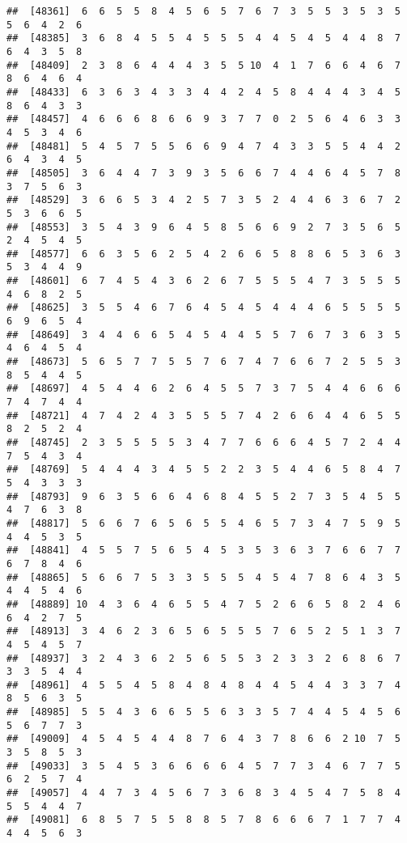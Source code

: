 \documentclass[
]{book}
\begin{document}
\begin{verbatim}
##  [48361]  6  6  5  5  8  4  5  6  5  7  6  7  3  5  5  3  5  3  5  5  6  4  2  6
##  [48385]  3  6  8  4  5  5  4  5  5  5  4  4  5  4  5  4  4  8  7  6  4  3  5  8
##  [48409]  2  3  8  6  4  4  4  3  5  5 10  4  1  7  6  6  4  6  7  8  6  4  6  4
##  [48433]  6  3  6  3  4  3  3  4  4  2  4  5  8  4  4  4  3  4  5  8  6  4  3  3
##  [48457]  4  6  6  6  8  6  6  9  3  7  7  0  2  5  6  4  6  3  3  4  5  3  4  6
##  [48481]  5  4  5  7  5  5  6  6  9  4  7  4  3  3  5  5  4  4  2  6  4  3  4  5
##  [48505]  3  6  4  4  7  3  9  3  5  6  6  7  4  4  6  4  5  7  8  3  7  5  6  3
##  [48529]  3  6  6  5  3  4  2  5  7  3  5  2  4  4  6  3  6  7  2  5  3  6  6  5
##  [48553]  3  5  4  3  9  6  4  5  8  5  6  6  9  2  7  3  5  6  5  2  4  5  4  5
##  [48577]  6  6  3  5  6  2  5  4  2  6  6  5  8  8  6  5  3  6  3  5  3  4  4  9
##  [48601]  6  7  4  5  4  3  6  2  6  7  5  5  5  4  7  3  5  5  5  4  6  8  2  5
##  [48625]  3  5  5  4  6  7  6  4  5  4  5  4  4  4  6  5  5  5  5  6  9  6  5  4
##  [48649]  3  4  4  6  6  5  4  5  4  4  5  5  7  6  7  3  6  3  5  4  6  4  5  4
##  [48673]  5  6  5  7  7  5  5  7  6  7  4  7  6  6  7  2  5  5  3  8  5  4  4  5
##  [48697]  4  5  4  4  6  2  6  4  5  5  7  3  7  5  4  4  6  6  6  7  4  7  4  4
##  [48721]  4  7  4  2  4  3  5  5  5  7  4  2  6  6  4  4  6  5  5  8  2  5  2  4
##  [48745]  2  3  5  5  5  5  3  4  7  7  6  6  6  4  5  7  2  4  4  7  5  4  3  4
##  [48769]  5  4  4  4  3  4  5  5  2  2  3  5  4  4  6  5  8  4  7  5  4  3  3  3
##  [48793]  9  6  3  5  6  6  4  6  8  4  5  5  2  7  3  5  4  5  5  4  7  6  3  8
##  [48817]  5  6  6  7  6  5  6  5  5  4  6  5  7  3  4  7  5  9  5  4  4  5  3  5
##  [48841]  4  5  5  7  5  6  5  4  5  3  5  3  6  3  7  6  6  7  7  6  7  8  4  6
##  [48865]  5  6  6  7  5  3  3  5  5  5  4  5  4  7  8  6  4  3  5  4  4  5  4  6
##  [48889] 10  4  3  6  4  6  5  5  4  7  5  2  6  6  5  8  2  4  6  6  4  2  7  5
##  [48913]  3  4  6  2  3  6  5  6  5  5  5  7  6  5  2  5  1  3  7  4  5  4  5  7
##  [48937]  3  2  4  3  6  2  5  6  5  5  3  2  3  3  2  6  8  6  7  3  3  5  4  4
##  [48961]  4  5  5  4  5  8  4  8  4  8  4  4  5  4  4  3  3  7  4  8  5  6  3  5
##  [48985]  5  5  4  3  6  6  5  5  6  3  3  5  7  4  4  5  4  5  6  5  6  7  7  3
##  [49009]  4  5  4  5  4  4  8  7  6  4  3  7  8  6  6  2 10  7  5  3  5  8  5  3
##  [49033]  3  5  4  5  3  6  6  6  6  4  5  7  7  3  4  6  7  7  5  6  2  5  7  4
##  [49057]  4  4  7  3  4  5  6  7  3  6  8  3  4  5  4  7  5  8  4  5  5  4  4  7
##  [49081]  6  8  5  7  5  5  8  8  5  7  8  6  6  6  7  1  7  7  4  4  4  5  6  3

\end{verbatim}
\end{document}
